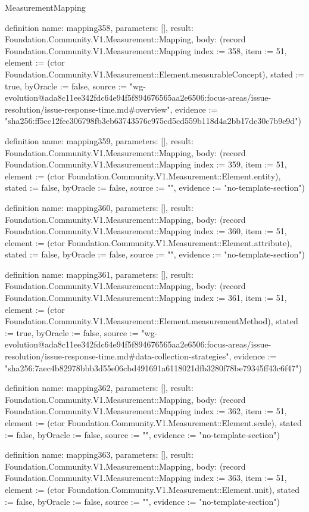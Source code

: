\begin{lexlean}{MeasurementMapping}
\begin{semanticmodule}
definition{
  name: mapping358,
  parameters: [],
  result: Foundation.Community.V1.Measurement::Mapping,
  body: (record Foundation.Community.V1.Measurement::Mapping {index := 358, item := 51, element := (ctor Foundation.Community.V1.Measurement::Element.measurableConcept), stated := true, byOracle := false, source := "wg-evolution@ada8c11ee342fdc64e94f5f894676565aa2e6506:focus-areas/issue-resolution/issue-response-time.md#overview", evidence := "sha256:ff5cc12fec306798fb3eb63743576c975cd5cd559b118d4a2bb17dc30c7b9e9d"})
}

definition{
  name: mapping359,
  parameters: [],
  result: Foundation.Community.V1.Measurement::Mapping,
  body: (record Foundation.Community.V1.Measurement::Mapping {index := 359, item := 51, element := (ctor Foundation.Community.V1.Measurement::Element.entity), stated := false, byOracle := false, source := "", evidence := "no-template-section"})
}

definition{
  name: mapping360,
  parameters: [],
  result: Foundation.Community.V1.Measurement::Mapping,
  body: (record Foundation.Community.V1.Measurement::Mapping {index := 360, item := 51, element := (ctor Foundation.Community.V1.Measurement::Element.attribute), stated := false, byOracle := false, source := "", evidence := "no-template-section"})
}

definition{
  name: mapping361,
  parameters: [],
  result: Foundation.Community.V1.Measurement::Mapping,
  body: (record Foundation.Community.V1.Measurement::Mapping {index := 361, item := 51, element := (ctor Foundation.Community.V1.Measurement::Element.measurementMethod), stated := true, byOracle := false, source := "wg-evolution@ada8c11ee342fdc64e94f5f894676565aa2e6506:focus-areas/issue-resolution/issue-response-time.md#data-collection-strategies", evidence := "sha256:7aec4b82978bbb3d55e06cbd491691a6118021dfb3280f78be79345ff43c6f47"})
}

definition{
  name: mapping362,
  parameters: [],
  result: Foundation.Community.V1.Measurement::Mapping,
  body: (record Foundation.Community.V1.Measurement::Mapping {index := 362, item := 51, element := (ctor Foundation.Community.V1.Measurement::Element.scale), stated := false, byOracle := false, source := "", evidence := "no-template-section"})
}

definition{
  name: mapping363,
  parameters: [],
  result: Foundation.Community.V1.Measurement::Mapping,
  body: (record Foundation.Community.V1.Measurement::Mapping {index := 363, item := 51, element := (ctor Foundation.Community.V1.Measurement::Element.unit), stated := false, byOracle := false, source := "", evidence := "no-template-section"})
}


\end{semanticmodule}
\end{lexlean}
